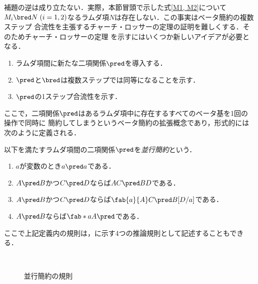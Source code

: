 \documentclass[uplatex,dvipdfmx,report,fleqn]{jsbook}
\begin{document}
補題の逆は成り立たない．実際，本節冒頭で示した式\eqref{M1, M2}について
$M_i\bred N\;(i=1,2)$なるラムダ項$N$は存在しない．この事実はベータ簡約の複数ステップ
合流性を主張するチャーチ・ロッサーの定理の証明を難しくする．そのためチャーチ・ロッサーの定理
を示すにはいくつか新しいアイデアが必要となる．
%
\begin{enumerate}
\item ラムダ項間に新たな二項関係$\pred$を導入する．
\item $\pred$と$\bred$は複数ステップでは同等になることを示す．
\item $\pred$の1ステップ合流性を示す．
\end{enumerate}
%
ここで，二項関係$\pred$はあるラムダ項中に存在するすべてのベータ基を1回の操作で同時に
簡約してしまうというベータ簡約の拡張概念であり，形式的には次のように定義される．
%
\begin{definition}[並行簡約]
以下を満たすラムダ項間の二項関係$\pred$を\emph{並行簡約}という．
%
\begin{enumerate}
\item $a$が変数のとき$a\pred a$である．
\item $A\pred B$かつ$C\pred D$ならば$AC\pred BD$である．
\item $A\pred B$かつ$C\pred D$ならば$\fab{a}{A}C\pred B[D/a]$である．
\item $A\pred B$ならば$\fab*{a}{A}\pred$である．
\end{enumerate}
\end{definition}
%
ここで上記定義内の規則は，に示す4つの推論規則として記述することもできる．
%
\begin{figure}
\centering
\begin{minipage}{.35\textwidth}
\centering
{}
\end{minipage}
\begin{minipage}{.35\textwidth}
\centering
{}
\end{minipage}
%
\\
%
\begin{minipage}{.35\textwidth}
\centering
{}
\end{minipage}
\begin{minipage}{.35\textwidth}
\centering
{}
\end{minipage}
\caption{並行簡約の規則}
\end{figure}

\NeedsRevision
\end{document}
